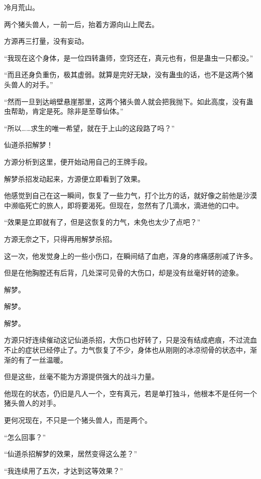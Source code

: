 
\begin{this_body}

冷月荒山。

两个猪头兽人，一前一后，抬着方源向山上爬去。

方源再三打量，没有妄动。

“我现在这个身体，是一位四转蛊师，空窍还在，真元也有，但是蛊虫一只都没。”

“而且还身负重伤，极其虚弱。就算是完好无缺，没有蛊虫的话，也不是这两个猪头兽人的对手。”

“然而一旦到达峭壁悬崖那里，这两个猪头兽人就会把我抛下。如此高度，没有蛊虫帮助，肯定是死。除非是至尊仙体。”

“所以……求生的唯一希望，就在于上山的这段路了吗？”

仙道杀招解梦！

方源分析到这里，便开始动用自己的王牌手段。

解梦杀招发动起来，方源便立即看到了效果。

他感觉到自己在这一瞬间，恢复了一些力气，打个比方的话，就好像之前他是沙漠中濒临死亡的旅人，即将要渴死。但现在，忽然有了几滴水，滴进他的口中。

“效果是立即就有了，但是这恢复的力气，未免也太少了点吧？”

方源无奈之下，只得再用解梦杀招。

这一次，他发觉身上的一些小伤口，在瞬间结了血疤，浑身的疼痛感削减了许多。

但是在他胸膛还有后背，几处深可见骨的大伤口，却是没有丝毫好转的迹象。

解梦。

解梦。

解梦。

方源只好连续催动这记仙道杀招，大伤口也好转了，只是没有结成疤痕，不过流血不止的症状已经停止了。力气恢复了不少，身体也从刚刚的冰凉彻骨的状态中，渐渐的有了一丝温暖。

但是这些，丝毫不能为方源提供强大的战斗力量。

他现在的状态，仍旧是凡人一个，空有真元，若是单打独斗，他根本不是任何一个猪头兽人的对手。

更何况现在，不只是一个猪头兽人，而是两个。

“怎么回事？”

“仙道杀招解梦的效果，居然变得这么差？”

“我连续用了五次，才达到这等效果？”


\end{this_body}
